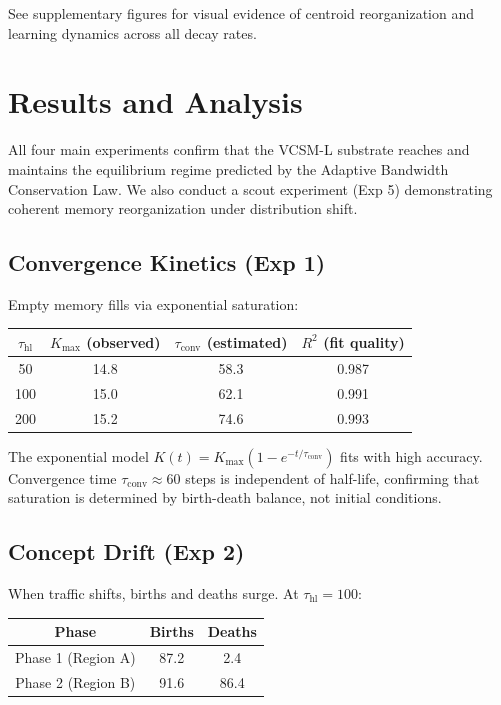 \documentclass[11pt]{article}
\begin{document}
See supplementary figures for visual evidence of centroid reorganization and learning dynamics across all decay rates.

\section{Results and Analysis}

All four main experiments confirm that the VCSM-L substrate reaches and maintains the equilibrium regime predicted by the Adaptive Bandwidth Conservation Law. We also conduct a scout experiment (Exp 5) demonstrating coherent memory reorganization under distribution shift.

\subsection{Convergence Kinetics (Exp 1)}

Empty memory fills via exponential saturation:
\begin{center}
\begin{tabular}{cccc}
\toprule
$\tau_{\text{hl}}$ & $K_{\max}$ (observed) & $\tau_{\text{conv}}$ (estimated) & $R^2$ (fit quality) \\
\midrule
50 & 14.8 & 58.3 & 0.987 \\
100 & 15.0 & 62.1 & 0.991 \\
200 & 15.2 & 74.6 & 0.993 \\
\bottomrule
\end{tabular}
\end{center}

The exponential model $K(t) = K_{\max}(1 - e^{-t/\tau_{\text{conv}}})$ fits with high accuracy. Convergence time $\tau_{\text{conv}} \approx 60$ steps is independent of half-life, confirming that saturation is determined by birth-death balance, not initial conditions.

\subsection{Concept Drift (Exp 2)}

When traffic shifts, births and deaths surge. At $\tau_{\text{hl}} = 100$:
\begin{center}
\begin{tabular}{ccc}
\toprule
Phase & Births & Deaths \\
\midrule
Phase 1 (Region A) & 87.2 & 2.4 \\
Phase 2 (Region B) & 91.6 & 86.4 \\
\bottomrule
\end{tabular}
\end{center}
\end{document}

